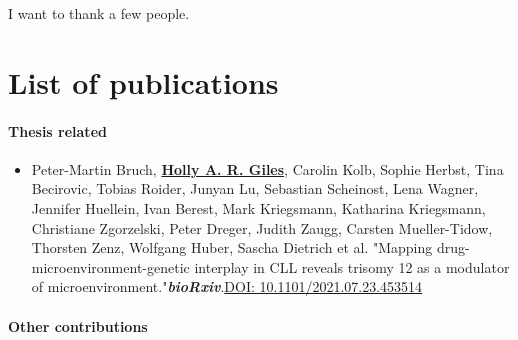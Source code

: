 \documentclass[11pt, a4paper, twosided]{book}
\begin{document}
I want to thank a few people.
\newpage\null\newpage


    \hypertarget{list-of-publications}{%
    \chapter*{List of publications}\label{list-of-publications}}

    \hypertarget{thesis-related}{%
    \subsubsection*{Thesis related}\label{thesis-related}}
    \begin{itemize}
        \item  Peter-Martin Bruch\ast,  \textbf{\underline{Holly A. R. Giles}}\ast, Carolin Kolb, Sophie Herbst, Tina Becirovic, Tobias Roider, Junyan Lu, Sebastian Scheinost, Lena Wagner, Jennifer Huellein, Ivan Berest, Mark Kriegsmann, Katharina Kriegsmann, Christiane Zgorzelski, Peter Dreger, Judith Zaugg, Carsten Mueller-Tidow, Thorsten Zenz, Wolfgang Huber, Sascha Dietrich et al. "Mapping drug-microenvironment-genetic interplay in CLL reveals trisomy 12 as a modulator of microenvironment."\textbf{\textit{bioRxiv}}.\href{https://doi.org/10.1101/2021.07.23.453514}{DOI: 10.1101/2021.07.23.453514} 
        
    \end{itemize}
    \hypertarget{other-contributions}{%
    \subsubsection*{Other contributions}\label{other-contributions}}
\end{document}
